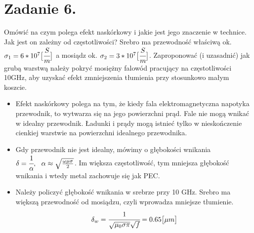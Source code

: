 \section*{Zadanie 6.}
\begin{task}
Omówić na czym polega efekt naskórkowy i jakie jest jego znaczenie w technice. Jak jest on zależny od częstotliwości? Srebro ma przewodność właściwą ok. $\sigma_{1}=6*10^{7} \big{[}\cfrac{S}{m}\big{]}$ a mosiądz ok. $\sigma_{2}=3*10^{7} \big{[}\cfrac{S}{m}\big{]}$. Zaproponować (i uzasadnić) jak grubą warstwą należy pokryć mosiężny falowód pracujący na częstotliwości 10GHz, aby uzyskać efekt zmniejszenia tłumienia przy stosunkowo małym koszcie.\\
\end{task}

\begin{solution}
\begin{itemize}
\item Efekt naskórkowy polega na tym, że kiedy fala elektromagnetyczna napotyka przewodnik, to wytwarza się na jego powierzchni prąd. Fale nie mogą wnikać w idealny przewodnik. Ładunki i prądy mogą istnieć tylko w nieskończenie cienkiej warstwie na powierzchni idealnego przewodnika.
\item Gdy przewodnik nie jest idealny, mówimy o głębokości wnikania $\delta=\cfrac{1}{\alpha}, \ \ \alpha\approx\sqrt{\frac{\omega\mu\sigma}{2}}$. Im większa częstotliwość, tym mniejsza głębokość wnikania i wtedy metal zachowuje się jak PEC.\\
\item Należy policzyć głębokość wnikania w srebrze przy 10 GHz. Srebro ma większą przewodność od mosiądzu, czyli wprowadza mniejsze tłumienie.
$$\delta_{w}=\cfrac{1}{\sqrt{\mu_{0}\sigma\pi}\sqrt{f}}=0.65 \big{[}\mu m\big{]}$$
\end{itemize}
\end{solution}